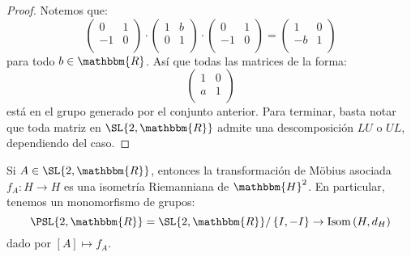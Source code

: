 \documentclass[12pt]{report}
\newcounter{it}
\theoremstyle{largebreak}
\newcommand\cf[3]{\ensuremath{#1:#2\rightarrow#3}}
\newcommand{\bbm}[1]{\ensuremath{\mathbbm{#1}}}
\newcommand{\Isom}[1]{\ensuremath{\textup{Isom}\left(#1\right)}}
\begin{document}
    \begin{proof}
        Notemos que:
        \begin{equation*}
            \left(\begin{array}{cc}
                0 & 1 \\
                -1 & 0 \\
            \end{array} \right)\cdot\left(\begin{array}{cc}
                1 & b \\
                0 & 1 \\
            \end{array} \right)\cdot\left(\begin{array}{cc}
                0 & 1 \\
                -1 & 0 \\
            \end{array} \right)=\left(\begin{array}{cc}
                1 & 0 \\
                -b & 1 \\
            \end{array} \right)
        \end{equation*}
        para todo $b\in\bbm{R}$. Así que todas las matrices de la forma:
        \begin{equation*}
            \left(\begin{array}{cc}
                1 & 0 \\
                a & 1 \\
            \end{array} \right)
        \end{equation*}
        está en el grupo generado por el conjunto anterior. Para terminar, basta notar que toda matriz en $\SL{2,\bbm{R}}$ admite una descomposición $LU$ o $UL$, dependiendo del caso.
    \end{proof}

    \begin{propo}
        Si $A\in\SL{2,\bbm{R}}$, entonces la transformación de Möbius asociada $\cf{f_A}{H}{H}$ es una isometría Riemanniana de $\bbm{H}^2$. En particular, tenemos un monomorfismo de grupos:
        \begin{equation*}
            \PSL{2,\bbm{R}}=\SL{2,\bbm{R}}/\left\{I,-I \right\}\rightarrow\Isom{H,d_H}
        \end{equation*}
        dado por $[A]\mapsto f_A$.
    \end{propo}
\end{document}
